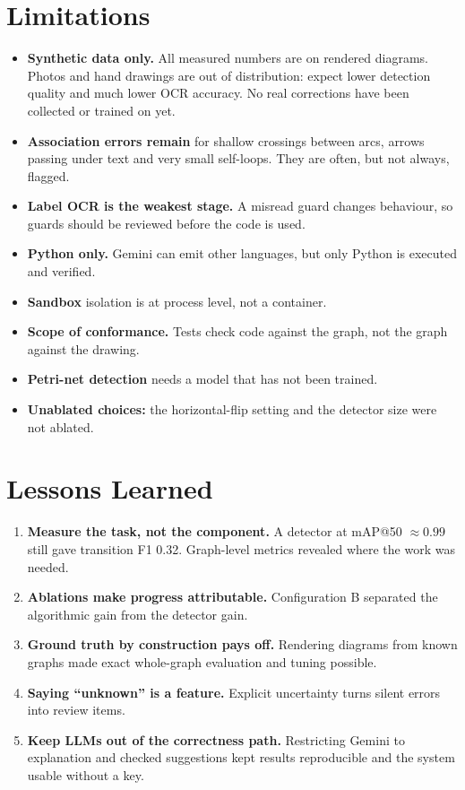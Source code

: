 \documentclass[journal,10pt]{IEEEtran}
\begin{document}
\section{Limitations}
\label{sec:limits}
\begin{itemize}
\item \textbf{Synthetic data only.} All measured numbers are on rendered diagrams. Photos
and hand drawings are out of distribution: expect lower detection quality and much lower
OCR accuracy. No real corrections have been collected or trained on yet.
\item \textbf{Association errors remain} for shallow crossings between arcs, arrows passing
under text and very small self-loops. They are often, but not always, flagged.
\item \textbf{Label OCR is the weakest stage.} A misread guard changes behaviour, so guards
should be reviewed before the code is used.
\item \textbf{Python only.} Gemini can emit other languages, but only Python is executed
and verified.
\item \textbf{Sandbox} isolation is at process level, not a container.
\item \textbf{Scope of conformance.} Tests check code against the graph, not the graph
against the drawing.
\item \textbf{Petri-net detection} needs a model that has not been trained.
\item \textbf{Unablated choices:} the horizontal-flip setting and the detector size were
not ablated.
\end{itemize}

\section{Lessons Learned}
\begin{enumerate}
\item \textbf{Measure the task, not the component.} A detector at mAP@50 $\approx0.99$ still
gave transition F1 0.32. Graph-level metrics revealed where the work was needed.
\item \textbf{Ablations make progress attributable.} Configuration B separated the
algorithmic gain from the detector gain.
\item \textbf{Ground truth by construction pays off.} Rendering diagrams from known graphs
made exact whole-graph evaluation and tuning possible.
\item \textbf{Saying ``unknown'' is a feature.} Explicit uncertainty turns silent errors
into review items.
\item \textbf{Keep LLMs out of the correctness path.} Restricting Gemini to explanation and
checked suggestions kept results reproducible and the system usable without a key.
\end{enumerate}
\end{document}
